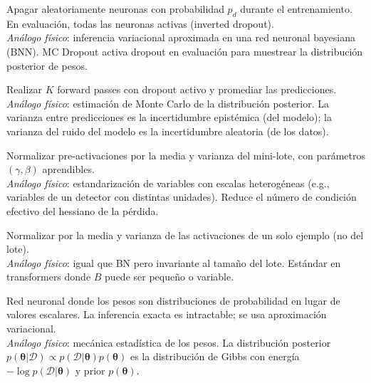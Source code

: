\begin{description}[leftmargin=0pt, labelwidth=!, labelsep=1em,
  font=\normalfont\bfseries, style=nextline]

\item[Dropout]
Apagar aleatoriamente neuronas con probabilidad $p_d$ durante el
entrenamiento. En evaluación, todas las neuronas activas (inverted dropout).\\
\emph{Análogo físico}: inferencia variacional aproximada en una red neuronal
bayesiana (BNN). MC Dropout activa dropout en evaluación para muestrear la
distribución posterior de pesos.

\item[MC Dropout --- \textit{Monte Carlo Dropout}]
Realizar $K$ forward passes con dropout activo y promediar las predicciones.\\
\emph{Análogo físico}: estimación de Monte Carlo de la distribución posterior.
La varianza entre predicciones es la incertidumbre epistémica (del modelo);
la varianza del ruido del modelo es la incertidumbre aleatoria (de los datos).

\item[BN --- \textit{Batch Normalization}]
Normalizar pre-activaciones por la media y varianza del mini-lote, con
parámetros $(\gamma, \beta)$ aprendibles.\\
\emph{Análogo físico}: estandarización de variables con escalas
heterogéneas (e.g., variables de un detector con distintas unidades).
Reduce el número de condición efectivo del hessiano de la pérdida.

\item[LN --- \textit{Layer Normalization}]
Normalizar por la media y varianza de las activaciones de un solo ejemplo
(no del lote).\\
\emph{Análogo físico}: igual que BN pero invariante al tamaño del lote.
Estándar en transformers donde $B$ puede ser pequeño o variable.

\item[BNN --- \textit{Bayesian Neural Network}]
Red neuronal donde los pesos son distribuciones de probabilidad en lugar
de valores escalares. La inferencia exacta es intractable; se usa
aproximación variacional.\\
\emph{Análogo físico}: mecánica estadística de los pesos. La distribución
posterior $p(\bm{\theta}|\mathcal{D}) \propto p(\mathcal{D}|\bm{\theta})
p(\bm{\theta})$ es la distribución de Gibbs con energía
$-\log p(\mathcal{D}|\bm{\theta})$ y prior $p(\bm{\theta})$.

\end{description}

